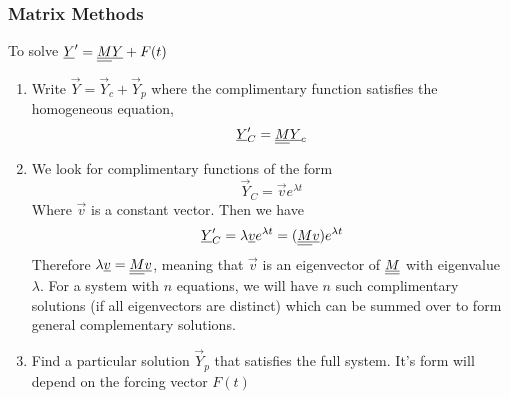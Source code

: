 \documentclass{article}
\begin{document}
\subsubsection{Matrix Methods}
To solve $\underline{Y}' = \underline{\underline{M}} \underline{Y} + F(t)$
\begin{enumerate}[label=(\arabic*)]
    \item Write $\vec Y = \vec Y_c + \vec Y_p$ where the complimentary function satisfies the homogeneous equation,
    \[
        \underline{Y}'_C = \underline{\underline{M}} \underline{Y}_c
    \]

    \item We look for complimentary functions of the form
    \[
        \vec Y_C = \vec v e^{\lambda t}
    \]
    Where $\vec v$ is a constant vector. Then we have
    \[
        \underline{Y}'_C = \lambda \underline{v} e^{\lambda t} = (\underline{\underline{M}} \underline{v})e^{\lambda t}
    \]
    Therefore $\lambda \underline{v} = \underline{\underline{M}} \underline{v}$, meaning that $\vec v$ is an eigenvector of $\underline{\underline{M}}$ with eigenvalue $\lambda$.
    For a system with $n$ equations, we will have $n$ such complimentary solutions (if all eigenvectors are distinct) which can be summed over to form general complementary solutions.

    \item Find a particular solution $\vec Y_p$ that satisfies the full system.
    It's form will depend on the forcing vector $F(t)$
\end{enumerate}
\end{document}
